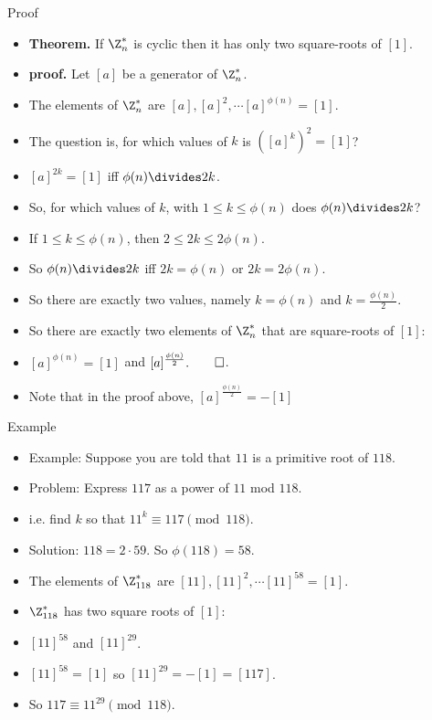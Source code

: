 \documentclass{beamer}
\begin{document}
\begin{frame}{Proof}

\begin{itemize}
  \item \textbf{Theorem.} If $\Z_n^*$ is cyclic then it has only two square-roots of $[1]$.
  \item \textbf{proof.} Let $[a]$ be a generator of $\Z_n^*$.
  \item The elements of $\Z_n^*$ are $[a],[a]^2,\cdots [a]^{\phi(n)} = [1]$.
  \item The question is, for which values of $k$  is $([a]^k)^2=[1]$?
  \item $[a]^{2k}=[1]$ iff $\phi(n)\divides 2k$.
  \item So, for which values of $k$, with $1\leq k \leq \phi(n)$ does $\phi(n)\divides 2k$?
  \item If $1\leq k \leq \phi(n)$, then $2\leq 2k \leq 2\phi(n)$.
  \item So $\phi(n)\divides 2k$ iff $2k = \phi(n)$ or $2k = 2\phi(n)$.
  \item So there are exactly two values, namely $k=\phi(n)$ and $k=\frac{\phi(n)}{2}$.
  \item So there are exactly two elements of $\Z_n^*$ that are square-roots of $[1]$:
  \item $[a]^{\phi(n)}=[1]$ and $[a]^{\frac{\phi(n)}{2}}.\qed$.
  \item Note that in the proof above, $[a]^{\frac{\phi(n)}{2}}=-[1]$
\end{itemize}

\end{frame}


\begin{frame}{Example}

\begin{itemize}
  \item Example: Suppose you are told that $11$ is a primitive root of $118$.
  \item Problem: Express $117$ as a power of $11$ mod $118$.
  \item i.e. find $k$ so that $11^k \equiv 117 \pmod {118}$.
  \item Solution: $118=2\cdot 59$. So $\phi(118) = 58$.
  \item The elements of $\Z_{118}^*$ are $[11],[11]^2,\cdots[11]^{58} = [1]$.
  \item $\Z_{118}^*$ has two square roots of $[1]$:
  \item $[11]^{58}$ and $[11]^{29}$.
  \item $[11]^{58} = [1]$ so $[11]^{29} = -[1] = [117]$.
  \item So $117 \equiv 11^{29} \pmod {118}$.
\end{itemize}

\end{frame}
\end{document}
